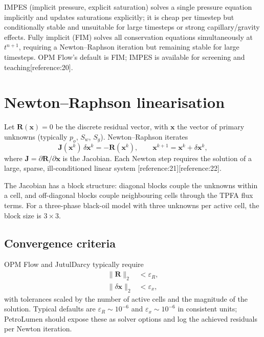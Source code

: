 \documentclass[10pt,a4paper]{article}
\begin{document}
IMPES (implicit pressure, explicit saturation) solves a single pressure equation
implicitly and updates saturations explicitly; it is cheap per timestep but
conditionally stable and unsuitable for large timesteps or strong
capillary/gravity effects. Fully implicit (FIM) solves all conservation
equations simultaneously at $t^{n+1}$, requiring a Newton--Raphson iteration
but remaining stable for large timesteps. OPM Flow's default is FIM; IMPES is
available for screening and teaching[reference:20].

\section{Newton--Raphson linearisation}

Let $\bm{R}(\bm{x})=0$ be the discrete residual vector, with $\bm{x}$ the vector
of primary unknowns (typically $p_o$, $S_w$, $S_g$). Newton--Raphson iterates
\begin{equation}
  \bm{J}(\bm{x}^k)\,\delta\bm{x}^k = -\bm{R}(\bm{x}^k),
  \qquad
  \bm{x}^{k+1} = \bm{x}^k + \delta\bm{x}^k,
  \label{eq:newton}
\end{equation}
where $\bm{J}=\partial\bm{R}/\partial\bm{x}$ is the Jacobian. Each Newton step
requires the solution of a large, sparse, ill-conditioned linear system
[reference:21][reference:22].

The Jacobian has a block structure: diagonal blocks couple the unknowns within a
cell, and off-diagonal blocks couple neighbouring cells through the TPFA flux
terms. For a three-phase black-oil model with three unknowns per active cell,
the block size is $3\times 3$.

\subsection{Convergence criteria}

OPM Flow and JutulDarcy typically require
\begin{align}
  \|\bm{R}\|_2 &< \varepsilon_R, \label{eq:conv-res}\\
  \|\delta\bm{x}\|_2 &< \varepsilon_x, \label{eq:conv-dx}
\end{align}
with tolerances scaled by the number of active cells and the magnitude of the
solution. Typical defaults are $\varepsilon_R\sim10^{-6}$ and
$\varepsilon_x\sim10^{-6}$ in consistent units; PetroLumen should expose these
as solver options and log the achieved residuals per Newton iteration.
\end{document}
